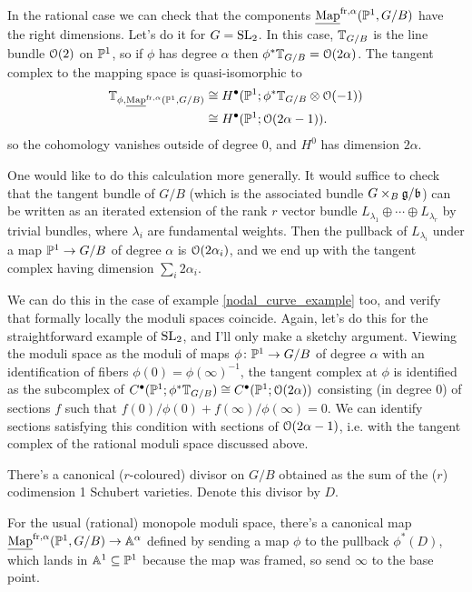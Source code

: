 \documentclass[10pt, oneside, a4paper]{article}
\newcommand{\map}{\ul{\mr{Map}}}
\begin{document}
\begin{remark}
In the rational case we can check that the components $\map^{\mr{fr},\alpha}(\bb P^1, G/B)$ have the right dimensions.  Let's do it for $G = \mathrm{SL}_2$.  In this case, $\mathbb{T}_{G/B}$ is the line bundle $\mathcal{O}(2)$ on $\mathbb{P}^1$, so if $\phi$ has degree $\alpha$ then $\phi^*\mathbb{T}_{G/B} = \mathcal{O}(2\alpha)$.  The tangent complex to the mapping space is quasi-isomorphic to 
\begin{align*}
\bb T_{\phi, \map^{\mr{fr},\alpha}(\bb P^1, G/B)} &\iso H^\bullet(\bb P^1; \phi^*\bb T_{G/B} \otimes \OO(-1)) \\
&\iso H^\bullet(\bb P^1; \OO(2\alpha-1)).
\end{align*}
so the cohomology vanishes outside of degree 0, and $H^0$ has dimension $2\alpha$.

One would like to do this calculation more generally.  It would suffice to check that the tangent bundle of $G/B$ (which is the associated bundle $G \times_B \mathfrak{g}/\mathfrak{b}$) can be written as an iterated extension of the rank $r$ vector bundle $L_{\lambda_1} \oplus \cdots \oplus L_{\lambda_r}$ by trivial bundles, where $\lambda_i$ are fundamental weights.  Then the pullback of $L_{\lambda_i}$ under a map $\mathbb{P}^1 \to G/B$ of degree $\alpha$ is $\mathcal{O}(2\alpha_i)$, and we end up with the tangent complex having dimension $\sum_i 2\alpha_i$.

We can do this in the case of example \ref{nodal_curve_example} too, and verify that formally locally the moduli spaces coincide.  Again, let's do this for the straightforward example of $\mathrm{SL}_2$, and I'll only make a sketchy argument.  Viewing the moduli space as the moduli of maps $\phi \colon \mathbb{P}^1 \to G/B$ of degree $\alpha$ with an identification of fibers $\phi(0) = \phi(\infty)^{-1}$, the tangent complex at $\phi$ is identified as the subcomplex of $C^\bullet(\mathbb{P}^1; \phi^*\mathbb{T}_{G/B}) \cong C^\bullet(\mathbb{P}^1; \mathcal{O}(2\alpha))$ consisting (in degree 0) of sections $f$ such that $f(0)/\phi(0) + f(\infty)/\phi(\infty) = 0$.  We can identify sections satisfying this condition with sections of $\mathcal{O}(2\alpha - 1)$, i.e. with the tangent complex of the rational moduli space discussed above.
\end{remark}


There's a canonical ($r$-coloured) divisor on $G/B$ obtained as the sum of the ($r$) codimension 1 Schubert varieties.  Denote this divisor by $D$. 

\begin{example}
For the usual (rational) monopole moduli space, there's a canonical map $\map^{\mr{fr},\alpha}(\bb P^1, G/B) \to \bb A^{\alpha}$ defined by sending a map $\phi$ to the pullback $\phi^*(D)$, which lands in $\mathbb{A}^1 \subseteq \mathbb{P}^1$ because the map was framed, so send $\infty$ to the base point.
\end{example}
\end{document}
